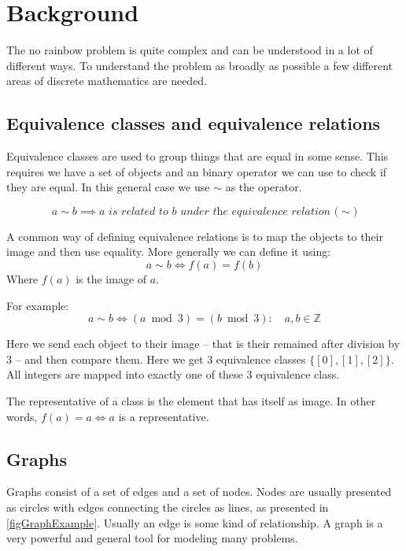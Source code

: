 \documentclass[msc,lith,english]{liuthesis}
\begin{document}
\chapter{Background}
\label{chaBackground}
The no rainbow problem is quite complex and can be understood in a lot of different ways.
To understand the problem as broadly as possible a few different areas of discrete mathematics are needed.

\section{Equivalence classes and equivalence relations}
Equivalence classes are used to group things that are equal in some sense.
This requires we have a set of objects and an binary operator we can use to check if they are equal.
In this general case we use $\sim$ as the operator.

$$
  a \sim b \implies \textit{$a$ is related to $b$ under the equivalence relation ($\sim$)}
$$

A common way of defining equivalence relations is to map the objects to their image and then use equality.
More generally we can define it using:
$$
  a \sim b \iff f(a) = f(b)
$$
Where $f(a)$ is the image of $a$.

For example:
$$
  a \sim b \iff (a \bmod 3) = (b \bmod 3) : \quad a, b \in \mathds{Z}
$$

Here we send each object to their image -- that is their remained after division by 3 -- and then compare them.
Here we get 3 equivalence classes $\{[0], [1], [2]\}$. All integers are mapped into exactly one of these 3 equivalence class.

The representative of a class is the element that has itself as image. In other words, $f(a) = a \iff a$ is a representative.
\cite[Section 7.3]{sourceArmen} \cite[Section 1.2]{sourceAATA}

\section{Graphs}
Graphs consist of a set of edges and a set of nodes.
Nodes are usually presented as circles with edges connecting the circles as lines, as presented in \ref{figGraphExample}.
Usually an edge is some kind of relationship. 
A graph is a very powerful and general tool for modeling many problems.
\end{document}
